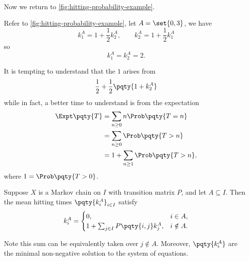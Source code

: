 Now we return to \autoref{fig:hitting-probability-example}.

\begin{example}
    Refer to \autoref{fig:hitting-probability-example}, let \(A = \set{0, 3}\), we have
    \[
        k_1^A = 1 + \frac{1}{2} k_2^A,\qquad
        k_2^A = 1 + \frac{1}{2} k_1^A
    \]
    so
    \[
        k_1^A = k_2^A = 2.
    \]

    It is tempting to understand that the \(1\) arises from
    \[
        \frac{1}{2} + \frac{1}{2} \pqty{1 + k_2^A}
    \]
    while in fact, a better time to understand is from the expectation
    \begin{align*}
        \Expt\pqty{T} &= \sum_{n \geq 0} n \Prob\pqty{T = n} \\
        &= \sum_{n \geq 0} \Prob\pqty{T > n} \\
        &= 1 + \sum_{n \geq 1} \Prob\pqty{T > n},
    \end{align*}
    where \(1 = \Prob\pqty{T > 0}\).
\end{example}

\begin{theorem}
    Suppose \(X\) is a Markov chain on \(I\) with transition matrix \(P\), and let \(A \subseteq I\). Then the mean hitting times \(\pqty{k_i^A}_{i \in I}\) satisfy
    \[
        k_i^A = \begin{cases}
            0, & i \in A, \\
            1 + \sum_{j \in I} P\pqty{i, j} k_j^A, & i \notin A.
        \end{cases}
    \]

    Note this sum can be equivalently taken over \(j \notin A\). Moreover, \(\pqty{k_i^A}\) are the minimal non-negative solution to the system of equations.
\end{theorem}

